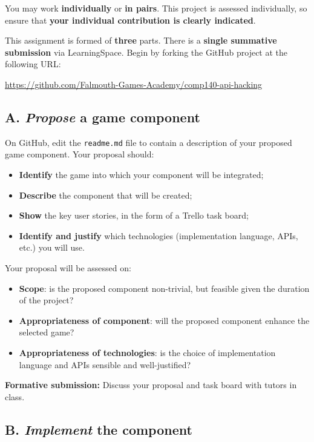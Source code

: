 \documentclass{../fal_assignment}
\begin{document}
You may work \textbf{individually} or \textbf{in pairs}.
This project is assessed individually, so ensure that \textbf{your individual contribution is clearly indicated}.

This assignment is formed of \textbf{three} parts.
There is a \textbf{single summative submission} via LearningSpace.
Begin by forking the GitHub project at the following URL:
\begin{center}
\url{https://github.com/Falmouth-Games-Academy/comp140-api-hacking}
\end{center}

\subsection*{A. \emph{Propose} a game component}

On GitHub, edit the \texttt{readme.md} file to contain a description of your proposed game component.
Your proposal should:
\begin{itemize}
    \item \textbf{Identify} the game into which your component will be integrated;
    \item \textbf{Describe} the component that will be created;
    \item \textbf{Show} the key user stories, in the form of a Trello task board;
    \item \textbf{Identify and justify} which technologies (implementation language, APIs, etc.) you will use.
\end{itemize}
Your proposal will be assessed on:
\begin{itemize}
    \item \textbf{Scope}:
        is the proposed component non-trivial, but feasible given the duration of the project?
    \item \textbf{Appropriateness of component}:
        will the proposed component enhance the selected game?
    \item \textbf{Appropriateness of technologies}:
        is the choice of implementation language and APIs sensible and well-justified?
\end{itemize}

\textbf{Formative submission:} Discuss your proposal and task board with tutors in class.

\subsection*{B. \emph{Implement} the component}
\end{document}
